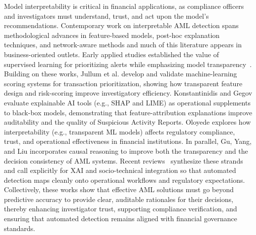 \documentclass[11pt,english]{article}
\begin{document}
Model interpretability is critical in financial applications, as compliance officers and investigators must understand, trust, and act upon the model’s recommendations. Contemporary work on interpretable AML detection spans methodological advances in feature-based models, post-hoc explanation techniques, and network-aware methods and much of this literature appears in business-oriented outlets. Early applied studies established the value of supervised learning for prioritizing alerts while emphasizing model transparency~\parencite{chen2018machine, han2020artificial}. Building on these works, Jullum et al. \parencite*{jullum2020detecting} develop and validate machine-learning scoring systems for transaction prioritization, showing how transparent feature design and risk-scoring improve investigatory efficiency. Konstantinidis and Gegov \parencite*{konstantinidis2024deep} evaluate explainable AI tools (e.g., SHAP and LIME) as operational supplements to black-box models, demonstrating that feature-attribution explanations improve auditability and the quality of Suspicious Activity Reports. Oloyede \parencite*{oloyede2025evaluating} explores how interpretability (e.g., transparent ML models) affects regulatory compliance, trust, and operational effectiveness in financial institutions.  In parallel, Gu, Yang, and Liu \parencite*{gu2025optimization} incorporates causal reasoning to improve both the transparency and the decision consistency of AML systems. Recent reviews~\parencite{mazumder2025explainable} synthesize these strands and call explicitly for XAI and socio-technical integration so that automated detection maps cleanly onto operational workflows and regulatory expectations. Collectively, these works show that effective AML solutions must go beyond predictive accuracy to provide clear, auditable rationales for their decisions, thereby enhancing investigator trust, supporting compliance verification, and ensuring that automated detection remains aligned with financial governance standards.
\end{document}
